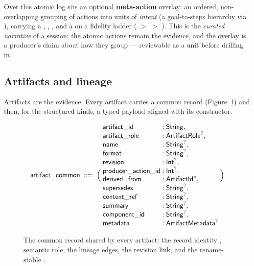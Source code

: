 Over this atomic log sits an optional \textbf{meta-action} overlay: an ordered, non-overlapping
grouping of actions into units of \emph{intent} (a goal-to-steps hierarchy via ),
carrying a , , , and a  on a fidelity ladder
( $>$  $>$ ). This is the \emph{curated
narrative} of a session: the atomic actions remain the evidence, and the overlay is a producer's
claim about how they group --- reviewable as a unit before drilling in.

\subsection{Artifacts and lineage}\label{sec:format-artifacts}

Artifacts are the evidence. Every artifact carries a common record (Figure~\ref{fig:fmt-artifact-common}) and then, for the structured
kinds, a typed payload aligned with its constructor.

\begin{figure}[H]
\centering
\small
\[
\id{artifact\_common} \;::=\; \Big(\;
\begin{array}{@{}l@{\;:\;}l@{}}
\id{artifact\_id}       & \id{String},\\
\id{artifact\_role}     & \opt{\id{ArtifactRole}},\\
\id{name}               & \opt{\id{String}},\\
\id{format}             & \opt{\id{String}},\\
\id{revision}           & \opt{\id{Int}},\\
\id{producer\_action\_id} & \opt{\id{Int}},\\
\id{derived\_from}      & \many{\id{ArtifactId}},\\
\id{supersedes}         & \opt{\id{String}},\\
\id{content\_ref}       & \opt{\id{String}},\\
\id{summary}            & \opt{\id{String}},\\
\id{component\_id}      & \opt{\id{String}},\\
\id{metadata}           & \opt{\id{ArtifactMetadata}}
\end{array}
\;\Big)
\]
\caption{The common record shared by every artifact: the record identity , semantic role, the  lineage edges, the  revision link, and the rename-stable .}
\label{fig:fmt-artifact-common}
\end{figure}

